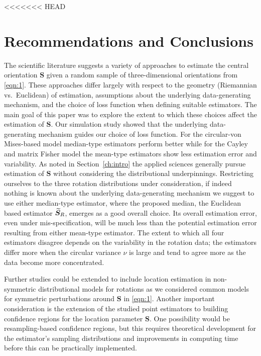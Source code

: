 <<<<<<< HEAD
\section{Recommendations and Conclusions}\label{sec:disc}

The scientific literature suggests a variety of approaches to estimate the central orientation $\bm S$ given a random sample of three-dimensional orientations from \eqref{eqn:1}. These approaches differ largely with respect to the geometry (Riemannian vs.~Euclidean) of estimation, assumptions about the underlying data-generating mechanism, and the choice of loss function when defining suitable estimators. The main goal of this paper was to explore the extent to which these choices affect the estimation of $\bm S$. 
Our simulation study showed that  the underlying data-generating mechanism guides our choice of loss function.  For the circular-von Mises-based model median-type estimators perform better while for the Cayley and matrix Fisher model the mean-type estimators show less estimation error and variability. As noted in Section~\ref{ch:intro} the applied sciences generally pursue estimation of $\bm S$ without considering the distributional underpinnings. Restricting ourselves to the three rotation distributions under consideration,  if indeed nothing is known about the underlying data-generating mechanism we suggest to use either median-type estimator, where the proposed median, the Euclidean based estimator ${\widetilde{\bm S}_R}$, emerges as a good overall choice. Its overall estimation error, even under mis-specification, will be much less than the potential estimation error resulting from either mean-type estimator. The extent to which all four estimators disagree depends on the variability in the rotation data; the estimators differ more when the circular variance $\nu$ is large and tend to agree more as the data become more concentrated.  
   
\noindent Further studies could be extended to include location estimation in non-symmetric distributional models for rotations as we considered common models for symmetric perturbations around $\bm S$ in \eqref{eqn:1}. Another important consideration is the extension of the studied point estimators to building confidence regions for the location parameter $\bm S$. One possibility would be resampling-based confidence regions, but this requires theoretical development for the estimator's sampling distributions and improvements in computing time before this can be practically implemented. \\

